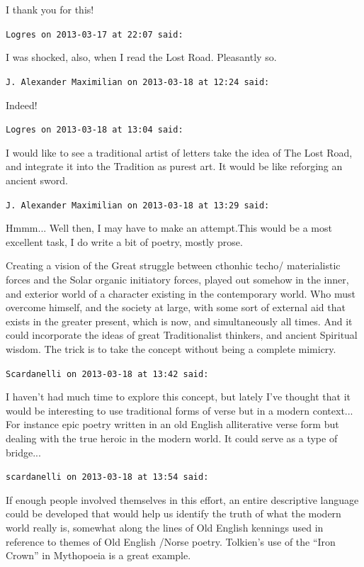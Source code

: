 \begin{footnotesize}
\begin{sffamily}
I thank you for this!

\hfill

\texttt{Logres on 2013-03-17 at 22:07 said:}

I was shocked, also, when I read the Lost Road. Pleasantly so.

\hfill

\texttt{J. Alexander Maximilian on 2013-03-18 at 12:24 said:}

Indeed!

\hfill

\texttt{Logres on 2013-03-18 at 13:04 said:}

I would like to see a traditional artist of letters take the idea of The Lost Road, and integrate it into the Tradition as purest art. It would be like reforging an ancient sword.

\hfill

\texttt{J. Alexander Maximilian on 2013-03-18 at 13:29 said:}

Hmmm... Well then, I may have to make an attempt.This would be a most excellent task, I do write a bit of poetry, mostly prose.

Creating a vision of the Great struggle between cthonhic techo/ materialistic forces and the Solar organic initiatory forces, played out somehow in the inner, and exterior world of a character existing in the contemporary world. Who must overcome himself, and the society at large, with some sort of external aid that exists in the greater present, which is now, and simultaneously all times. And it could incorporate the ideas of great Traditionalist thinkers, and ancient Spiritual wisdom. The trick is to take the concept without being a complete mimicry.

\hfill

\texttt{Scardanelli on 2013-03-18 at 13:42 said:}

I haven't had much time to explore this concept, but lately I've thought that it would be interesting to use traditional forms of verse but in a modern context... For instance epic poetry written in an old English alliterative verse form but dealing with the true heroic in the modern world. It could serve as a type of bridge... 

\hfill

\texttt{scardanelli on 2013-03-18 at 13:54 said:}

If enough people involved themselves in this effort, an entire descriptive language could be developed that would help us identify the truth of what the modern world really is, somewhat along the lines of Old English kennings used in reference to themes of Old English /Norse poetry. Tolkien's use of the ``Iron Crown'' in Mythopoeia is a great example.


\end{sffamily}
\end{footnotesize}
